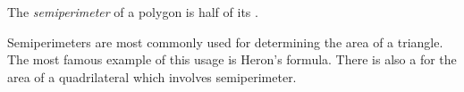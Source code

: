 \documentclass[12pt]{article}
\begin{document}
The \emph{semiperimeter} of a polygon is half of its .

Semiperimeters are most commonly used for determining the area of a triangle.  The most famous example of this usage is Heron's formula.  There is also a  for the area of a quadrilateral which involves semiperimeter.
\end{document}
